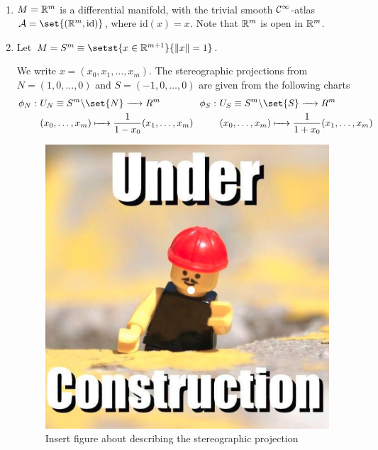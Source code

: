 \begin{example}
	~
	\begin{enumerate}[(1)]
		\item
		$M=\mathbb R^m$ is a differential manifold, with the trivial smooth $\mathcal{C}^\infty$-atlas $\calA = \set{(\bbR^m, \mathrm{id})}$, where $\mathrm{id}(x)=x$. Note that $\mathbb R^m$ is open in $\mathbb R^m$.

		\item
		Let $M=S^{m}\equiv \setst{x\in\bbR^{m+1}}{\norm{x}=1}$. 
			
		We write $x=(x_0,x_1,\dots,x_m)$. The stereographic projections from $N=(1,0,\dots,0)$ and $S=(-1,0,\dots,0)$ are given from the following charts
		\begin{align*}
			\begin{split}
				\phi_N :~ &U_N \equiv S^m\backslash\set{N} \to R^m \\
				&(x_0, \dots, x_m) \mapsto \frac{1}{1-x_0}(x_1, \dots, x_m) 
			\end{split}
			~~
			\begin{split}
				\phi_S :~ &U_S \equiv S^m\backslash\set{S} \to R^m \\
				&(x_0, \dots, x_m) \mapsto \frac{1}{1+x_0}(x_1, \dots, x_m) 
			\end{split}
		\end{align*}

		\begin{figure}[H]
			\centering
			\includegraphics[scale=0.25]{Figures/underconstruction.jpg}
			\caption{\color{red} Insert figure about describing the stereographic projection}
		\end{figure}
		

\end{enumerate}
\end{example}
